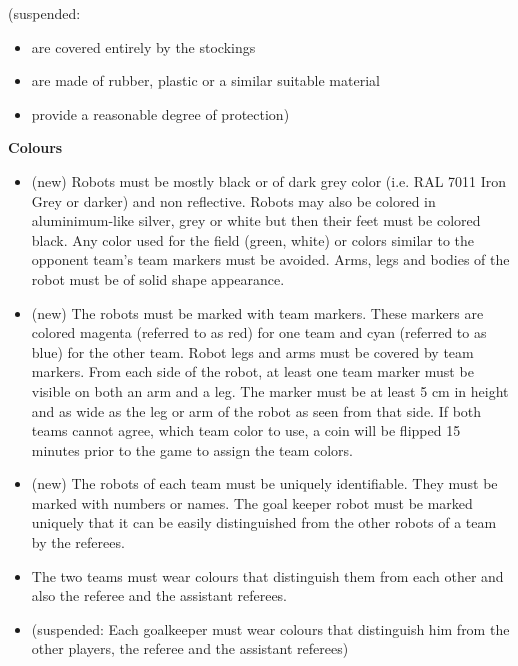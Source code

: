\headlinebox

{\color[rgb]{0.4,0.4,0.4}
(suspended:

\begin{itemize}
\item are covered entirely by the stockings
\item are made of rubber, plastic or a similar suitable material 
\item provide a reasonable degree of protection)
\end{itemize}
}

\bigskip

{\bfseries Colours}

\headlinebox

\begin{itemize}
\item (new) Robots must be mostly black or of dark grey color (i.e. RAL 7011 Iron Grey or darker) and non reflective. Robots may also be colored in aluminimum-like silver, grey or white but then their feet must be colored black. Any color used for the field (green, white) or colors similar to the opponent team's team markers must be avoided. Arms, legs and bodies of the robot must be of solid shape appearance.
\item (new) The robots must be marked with team markers. These markers are colored magenta (referred to as red) for one team and cyan (referred to as blue) for the other team. Robot legs and arms must be covered by team markers. From each side of the robot, at least one team marker must be visible on both an arm and a leg. The marker must be at least 5 cm in height and as wide as the leg or arm of the robot as seen from that side. If both teams cannot agree, which team color to use, a coin will be flipped 15 minutes prior to the game to assign the team colors.
\item (new) The robots of each team must be uniquely identifiable. They must be marked with numbers or names. The goal keeper robot must be marked uniquely that it can be easily distinguished from the other robots of a team by the referees. 
\item The two teams must wear colours that distinguish them from each other and also the referee and the assistant referees.
\item {\color[rgb]{0.4,0.4,0.4}
(suspended: Each goalkeeper must wear colours that distinguish him from the other players, the referee and the assistant referees) }
\end{itemize}

\bigskip

